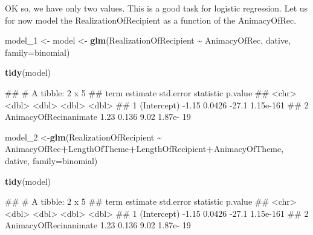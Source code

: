 \documentclass[
]{book}
\newenvironment{Shaded}{\begin{snugshade}}{\end{snugshade}}
\newcommand{\AttributeTok}[1]{\textcolor[rgb]{0.13,0.29,0.53}{#1}}
\newcommand{\FunctionTok}[1]{\textcolor[rgb]{0.13,0.29,0.53}{\textbf{#1}}}
\newcommand{\NormalTok}[1]{#1}
\newcommand{\OtherTok}[1]{\textcolor[rgb]{0.56,0.35,0.01}{#1}}
\newcommand{\SpecialCharTok}[1]{\textcolor[rgb]{0.81,0.36,0.00}{\textbf{#1}}}
\newcommand{\StringTok}[1]{\textcolor[rgb]{0.31,0.60,0.02}{#1}}
\begin{document}
OK so, we have only two values. This is a good task for logistic regression. Let us for now model the RealizationOfRecipient as a function of the AnimacyOfRec.

\begin{Shaded}
\begin{Highlighting}[]
\NormalTok{model\_1 }\OtherTok{\textless{}{-}}\NormalTok{ model }\OtherTok{\textless{}{-}} \FunctionTok{glm}\NormalTok{(RealizationOfRecipient }\SpecialCharTok{\textasciitilde{}}\NormalTok{ AnimacyOfRec, dative, }\AttributeTok{family=}\StringTok{\textquotesingle{}binomial\textquotesingle{}}\NormalTok{)}

\FunctionTok{tidy}\NormalTok{(model)}
\end{Highlighting}
\end{Shaded}

\begin{Shaded}
\begin{Highlighting}[]
\NormalTok{\#\# \# A tibble: 2 x 5}
\NormalTok{\#\#   term                  estimate std.error statistic   p.value}
\NormalTok{\#\#   \textless{}chr\textgreater{}                    \textless{}dbl\textgreater{}     \textless{}dbl\textgreater{}     \textless{}dbl\textgreater{}     \textless{}dbl\textgreater{}}
\NormalTok{\#\# 1 (Intercept)              {-}1.15    0.0426    {-}27.1  1.15e{-}161}
\NormalTok{\#\# 2 AnimacyOfRecinanimate     1.23    0.136       9.02 1.87e{-} 19}
\end{Highlighting}
\end{Shaded}

\begin{Shaded}
\begin{Highlighting}[]
\NormalTok{model\_2 }\OtherTok{\textless{}{-}}\FunctionTok{glm}\NormalTok{(RealizationOfRecipient }\SpecialCharTok{\textasciitilde{}}\NormalTok{ AnimacyOfRec}\SpecialCharTok{+}\NormalTok{LengthOfTheme}\SpecialCharTok{+}\NormalTok{LengthOfRecipient}\SpecialCharTok{+}\NormalTok{AnimacyOfTheme, dative, }\AttributeTok{family=}\StringTok{\textquotesingle{}binomial\textquotesingle{}}\NormalTok{)}

\FunctionTok{tidy}\NormalTok{(model)}
\end{Highlighting}
\end{Shaded}

\begin{Shaded}
\begin{Highlighting}[]
\NormalTok{\#\# \# A tibble: 2 x 5}
\NormalTok{\#\#   term                  estimate std.error statistic   p.value}
\NormalTok{\#\#   \textless{}chr\textgreater{}                    \textless{}dbl\textgreater{}     \textless{}dbl\textgreater{}     \textless{}dbl\textgreater{}     \textless{}dbl\textgreater{}}
\NormalTok{\#\# 1 (Intercept)              {-}1.15    0.0426    {-}27.1  1.15e{-}161}
\NormalTok{\#\# 2 AnimacyOfRecinanimate     1.23    0.136       9.02 1.87e{-} 19}
\end{Highlighting}
\end{Shaded}
\end{document}
